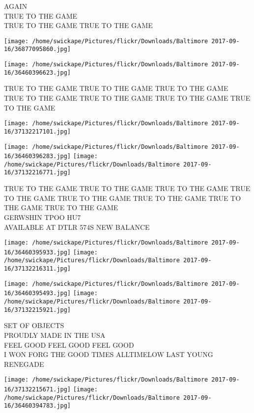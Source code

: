 \documentclass[10pt,letterpaper]{article}
\begin{document}
AGAIN\\
TRUE TO THE GAME\\
TRUE TO THE GAME TRUE TO THE GAME
\pagebreak

\texttt{[image: /home/swickape/Pictures/flickr/Downloads/Baltimore 2017-09-16/36877095860.jpg]}

\vspace{0.25in}
\texttt{[image: /home/swickape/Pictures/flickr/Downloads/Baltimore 2017-09-16/36460396623.jpg]}

TRUE TO THE GAME TRUE TO THE GAME TRUE TO THE GAME\\
TRUE TO THE GAME TRUE TO THE GAME TRUE TO THE GAME TRUE TO THE GAME
\pagebreak

\texttt{[image: /home/swickape/Pictures/flickr/Downloads/Baltimore 2017-09-16/37132217101.jpg]}

\vspace{0.25in}
\texttt{[image: /home/swickape/Pictures/flickr/Downloads/Baltimore 2017-09-16/36460396283.jpg]}
\texttt{[image: /home/swickape/Pictures/flickr/Downloads/Baltimore 2017-09-16/37132216771.jpg]}

TRUE TO THE GAME TRUE TO THE GAME TRUE TO THE GAME TRUE TO THE GAME TRUE TO THE GAME TRUE TO THE GAME TRUE TO THE GAME TRUE TO THE GAME\\
GERWSHIN TPOO HU7\\
AVAILABLE AT DTLR 574S NEW BALANCE
\pagebreak

\texttt{[image: /home/swickape/Pictures/flickr/Downloads/Baltimore 2017-09-16/36460395933.jpg]}
\texttt{[image: /home/swickape/Pictures/flickr/Downloads/Baltimore 2017-09-16/37132216311.jpg]}

\texttt{[image: /home/swickape/Pictures/flickr/Downloads/Baltimore 2017-09-16/36460395493.jpg]}
\texttt{[image: /home/swickape/Pictures/flickr/Downloads/Baltimore 2017-09-16/37132215921.jpg]}

SET OF OBJECTS\\
PROUDLY MADE IN THE USA\\
FEEL GOOD FEEL GOOD FEEL GOOD\\
I WON FORG THE GOOD TIMES ALLTIMELOW LAST YOUNG RENEGADE
\pagebreak

\texttt{[image: /home/swickape/Pictures/flickr/Downloads/Baltimore 2017-09-16/37132215671.jpg]}
\texttt{[image: /home/swickape/Pictures/flickr/Downloads/Baltimore 2017-09-16/36460394783.jpg]}
\end{document}
